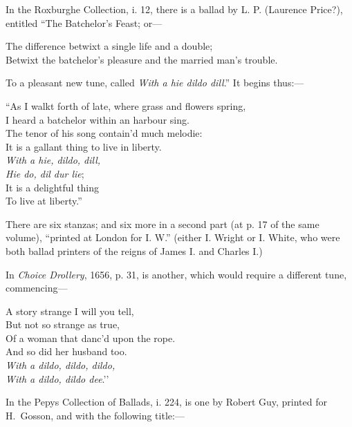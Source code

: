In the Roxburghe Collection, i. 12, there is a ballad by L. P. (Laurence Price?),
entitled “The Batchelor’s Feast; or—
\settowidth{\versewidth}{Betwixt the batchelor’s pleasure and the married man’s trouble.}
\begin{scverse}The difference betwixt a single life and a double;\\
Betwixt the batchelor’s pleasure and the married man’s trouble.
\end{scverse}
To a pleasant new tune, called \textit{With a hie dildo dill}.” It begins thus:—
\begin{scverse}\begin{patverse}
“As I walkt forth of late, where grass and flowers spring,\\
I heard a batchelor within an harbour sing.\\
The tenor of his song contain’d much melodie:\\
It is a gallant thing to live in liberty.\\
\textit{With a hie, dildo, dill,\\
Hie do, dil dur lie};\\
It is a delightful thing\\
To live at liberty.”
\end{patverse}
\end{scverse}
There are six stanzas; and six more in \pagebreak a second part (at p. 17 of the same
volume), “printed at London for I. W.” (either I. Wright or I. White, who were
both ballad printers of the reigns of James I. and Charles I.)

In \textit{Choice Drollery}, 1656, p. 31, is another, which would require a different
tune, commencing—
\settowidth{\versewidth}{Of a woman that danc’d upon the rope.}
\begin{scverse}\begin{altverse}
A story strange I will you tell,\\
But not so strange as true,\\
Of a woman that danc’d upon the rope.\\
And so did her husband too.\\
\textit{With a dildo, dildo, dildo,\\
With a dildo, dildo dee}.’’
\end{altverse}
\end{scverse}

In the Pepys Collection of Ballads, i. 224, is one by Robert Guy, printed for
H.~Gosson, and with the following title:—


